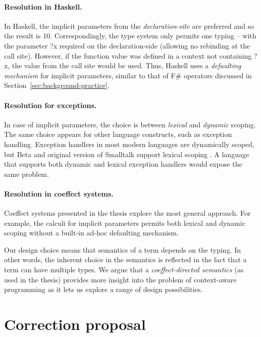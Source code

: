 \documentclass[
		twoside,openright,titlepage,numbers=noenddot,headinclude,%
                footinclude=true,cleardoublepage=empty,
                BCOR=10mm,paper=a4,fontsize=10pt, %
                ngerman,american, %
                ]{scrreprt}
\newcommand{\ident}[1]{\textnormal{\sffamily #1}}
\begin{document}
\paragraph{Resolution in Haskell.}
In Haskell, the implicit parameters from the \emph{declaration-site} are preferred and so the result
is 10. Correspondingly, the type system only permits one typing -- with the parameter \ident{?x}
required on the declaration-side (allowing no rebinding at the call site). However, if the function
value was defined in a context not containing \ident{?x}, the value from the call site would be used.
Thus, Haskell uses a \emph{defaulting mechanism} for implicit parameters, similar to that of F\#
operators discussed in Section~\ref{sec:background-practice}.

\paragraph{Resolution for exceptions.}
In case of implicit parameters, the choice is between \emph{lexical} and \emph{dynamic} scoping.
The same choice appears for other language constructs, such as exception handling. Exception
handlers in most modern languages are dynamically scoped, but Beta and original version of Smalltalk
support lexical scoping \cite{app-exceptions}. A language that supports both dynamic and lexical
exception handlers would expose the same problem.

\paragraph{Resolution in coeffect systems.}
Coeffect systems presented in the thesis explore the most general approach. For example, the
calculi for implicit parameters permits both lexical and dynamic scoping without a built-in ad-hoc
defaulting mechanism.

Our design choice means that semantics of a term depends on the typing. In other words, the
inherent choice in the semantics is reflected in the fact that a term can have multiple types.
We argue that a \emph{coeffect-directed semantics} (as used in the thesis) provides more insight
into the problem of context-aware programming as it lets us explore a range of design
possibilities.

\section{Correction proposal}
\label{sec:proposal}
\vspace{-1em}
\end{document}
